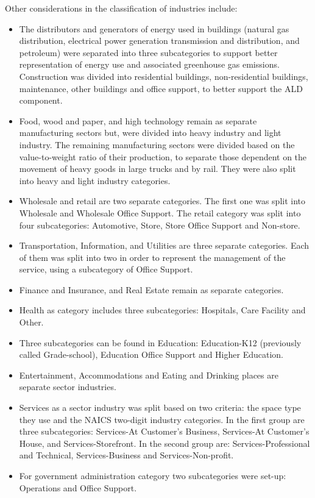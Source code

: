 Other considerations in the classification of industries include:
\begin{itemize}
\item The distributors and generators of energy used in buildings (natural gas distribution, electrical power generation transmission and distribution, and petroleum) were separated into three subcategories to support better representation of energy use and associated greenhouse gas emissions. Construction was divided into residential buildings, non-residential buildings, maintenance, other buildings and office support, to better support the ALD component.
\item Food, wood and paper, and high technology remain as separate manufacturing sectors but, were divided into heavy industry and light industry. The remaining manufacturing sectors were divided based on the value-to-weight ratio of their production, to separate those dependent on the movement of heavy goods in large trucks and by rail. They were also split into heavy and light industry categories.
\item Wholesale and retail are two separate categories. The first one was split into Wholesale and Wholesale Office Support. The retail category was split into four subcategories: Automotive, Store, Store Office Support and Non-store.
\item Transportation, Information, and Utilities are three separate categories. Each of them was split into two in order to represent the management of the service, using a subcategory of Office Support.
\item Finance and Insurance, and Real Estate remain as separate categories.
\item Health as category includes three subcategories: Hospitals, Care Facility and Other.
\item Three subcategories can be found in Education: Education-K12 (previously called Grade-school), Education Office Support and Higher Education.
\item Entertainment, Accommodations and Eating and Drinking places are separate sector industries.
\item Services as a sector industry was split based on two criteria: the space type they use and the NAICS two-digit industry categories. In the first group are three subcategories: Services-At Customer's Business, Services-At Customer's House, and Services-Storefront. In the second group are: Services-Professional and Technical, Services-Business and Services-Non-profit.
\item For government administration category two subcategories were set-up: Operations and Office Support.
\end{itemize} 

